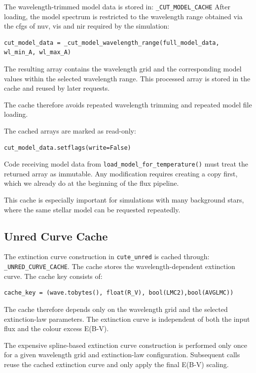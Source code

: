 The wavelength-trimmed model data is stored in: \texttt{\_CUT\_MODEL\_CACHE}
After loading, the model spectrum is restricted to the wavelength range obtained via the cfgs of nuv, vis and nir required by the simulation:

\begin{verbatim}
cut_model_data = _cut_model_wavelength_range(full_model_data, wl_min_A, wl_max_A)
\end{verbatim}

The resulting array contains the wavelength grid and the corresponding model values within the selected wavelength range. This processed array is stored in the cache and reused by later requests.

The cache therefore avoids repeated wavelength trimming and repeated model file loading.

The cached arrays are marked as read-only:

\begin{verbatim}
cut_model_data.setflags(write=False)
\end{verbatim}

Code receiving model data from \texttt{load\_model\_for\_temperature()} must treat the returned array as immutable. Any modification requires creating a copy first, which we already do at the beginning of the flux pipeline.

This cache is especially important for simulations with many background stars, where the same stellar model can be requested repeatedly.

\subsection{Unred Curve Cache}
\label{sec:unred_cache}
The extinction curve construction in \texttt{cute\_unred} is cached through: \texttt{\_UNRED\_CURVE\_CACHE}.
The cache stores the wavelength-dependent extinction curve.
The cache key consists of:

\begin{verbatim}
cache_key = (wave.tobytes(), float(R_V), bool(LMC2),bool(AVGLMC))
\end{verbatim}

The cache therefore depends only on the wavelength grid and the selected extinction-law parameters. The extinction curve is independent of both the input flux and the colour excess E(B-V).

The expensive spline-based extinction curve construction is performed only once for a given wavelength grid and extinction-law configuration. Subsequent calls reuse the cached extinction curve and only apply the final E(B-V) scaling.

